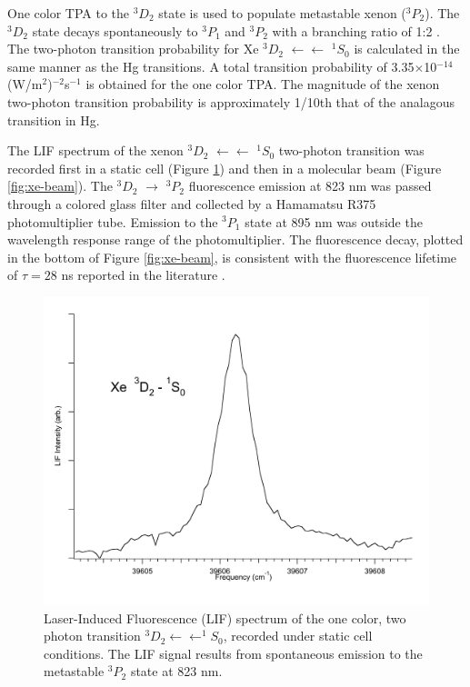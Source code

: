 \documentclass[12pt]{mitthesis}
\begin{document}
One color TPA to the $^3D_2$ state is used to populate metastable
xenon ($^3P_2$).  The $^3D_2$ state decays spontaneously to $^3P_1$
and $^3P_2$ with a branching ratio of 1:2 \cite{cabrera81}.  The
two-photon transition probability for Xe $^3D_2$ $\leftarrow
\leftarrow$ $^1S_0$ is calculated in the same manner as the Hg
transitions.  A total transition probability of 3.35$\times$10$^{-14}$
(W/m$^2$)$^{-2}$s$^{-1}$ is obtained for the one color TPA.  The
magnitude of the xenon two-photon transition probability is
approximately 1/10th that of the analagous transition in Hg.

The LIF spectrum of the xenon $^3D_2$ $\leftarrow \leftarrow$ $^1S_0$
two-photon transition was recorded first in a static cell (Figure
\ref{fig:xe3d2-cell}) and then in a molecular beam (Figure
\ref{fig:xe-beam}).  The $^3D_2$ $\rightarrow$ $^3P_2$ fluorescence
emission at 823 nm was passed through a colored glass filter and
collected by a Hamamatsu R375 photomultiplier tube.  Emission to the
$^3P_1$ state at 895 nm was outside the wavelength response range of
the photomultiplier.  The fluorescence decay, plotted in the bottom of
Figure \ref{fig:xe-beam}, is consistent with the fluorescence lifetime
of $\tau = 28$ ns reported in the literature \cite{cabrera81}.

\begin{figure}
  \caption{Laser-Induced Fluorescence (LIF) spectrum of the one color,
    two photon transition  $^3D_2 \leftarrow \leftarrow
    ^1S_0$, recorded under static cell conditions.  The LIF signal
    results from spontaneous emission to the metastable $^3P_2$
    state at 823 nm.}
  \label{fig:xe3d2-cell}
  \centering
  \vspace{1cm}
  \includegraphics[width=6in]{Xe3D2-cell.pdf}
  \vspace{3cm}
\end{figure}
\end{document}

